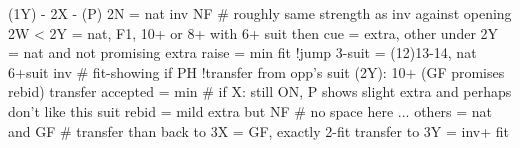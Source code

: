 (1Y) - 2X - (P)
2N = nat inv NF  # roughly same strength as inv against opening
2W < 2Y = nat, F1, 10+ or 8+ with 6+ suit
    then cue = extra, other under 2Y = nat and not promising extra
    raise = min fit
!jump 3-suit = (12)13-14, nat 6+suit inv  # fit-showing if PH
!transfer from opp's suit (2Y): 10+ (GF promises rebid)
    transfer accepted = min  # if X: still ON, P shows slight extra and perhaps don't like this suit
    rebid = mild extra but NF  # no space here ...
    others = nat and GF
    # transfer than back to 3X = GF, exactly 2-fit
transfer to 3Y = inv+ fit